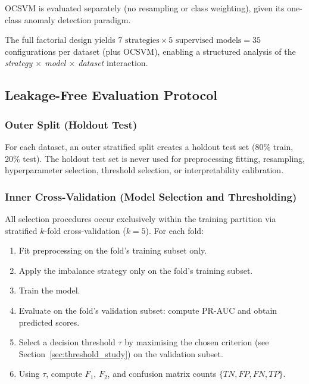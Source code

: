 OCSVM is evaluated separately (no resampling or class weighting), given its one-class anomaly detection paradigm.

The full factorial design yields $7 \text{ strategies} \times 5 \text{ supervised models} = 35$ configurations per dataset (plus OCSVM), enabling a structured analysis of the \emph{strategy $\times$ model $\times$ dataset} interaction.

\subsection{Leakage-Free Evaluation Protocol}
\label{sec:protocol}

\subsubsection{Outer Split (Holdout Test)}
For each dataset, an outer stratified split creates a holdout test set (80\% train, 20\% test). The holdout test set is never used for preprocessing fitting, resampling, hyperparameter selection, threshold selection, or interpretability calibration.

\subsubsection{Inner Cross-Validation (Model Selection and Thresholding)}
All selection procedures occur exclusively within the training partition via stratified $k$-fold cross-validation ($k=5$). For each fold:
\begin{enumerate}
  \item Fit preprocessing on the fold's training subset only.
  \item Apply the imbalance strategy only on the fold's training subset.
  \item Train the model.
  \item Evaluate on the fold's validation subset: compute PR-AUC and obtain predicted scores.
  \item Select a decision threshold $\tau$ by maximising the chosen criterion (see Section~\ref{sec:threshold_study}) on the validation subset.
  \item Using $\tau$, compute $F_1$, $F_2$, and confusion matrix counts $\{TN, FP, FN, TP\}$.
\end{enumerate}

